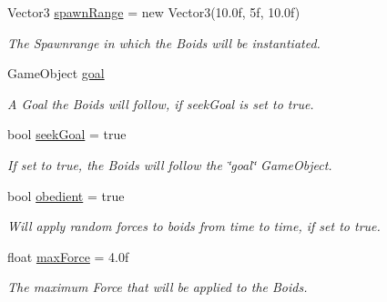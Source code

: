 \begin{DoxyCompactItemize}
Vector3 \hyperlink{class_p_s_flocking_1_1_p_s_unit_manager_aa9c3797d524485b906ca919640f80c57}{spawn\+Range} = new Vector3(10.\+0f, 5f, 10.\+0f)
\begin{DoxyCompactList}\small\item\em The Spawnrange in which the Boids will be instantiated. \end{DoxyCompactList}\item 
\mbox{\label{class_p_s_flocking_1_1_p_s_unit_manager_acab1025d71a518ffd6fdecfbeef80b0a}} 
Game\+Object \hyperlink{class_p_s_flocking_1_1_p_s_unit_manager_acab1025d71a518ffd6fdecfbeef80b0a}{goal}
\begin{DoxyCompactList}\small\item\em A Goal the Boids will follow, if seek\+Goal is set to true. \end{DoxyCompactList}\item 
\mbox{\label{class_p_s_flocking_1_1_p_s_unit_manager_ae308dcd912212ae803fd6d9c48b25288}} 
bool \hyperlink{class_p_s_flocking_1_1_p_s_unit_manager_ae308dcd912212ae803fd6d9c48b25288}{seek\+Goal} = true
\begin{DoxyCompactList}\small\item\em If set to true, the Boids will follow the \char`\"{}goal\char`\"{} Game\+Object. \end{DoxyCompactList}\item 
\mbox{\label{class_p_s_flocking_1_1_p_s_unit_manager_a6ee39d3bff7f5f98b688738c82dbfbf3}} 
bool \hyperlink{class_p_s_flocking_1_1_p_s_unit_manager_a6ee39d3bff7f5f98b688738c82dbfbf3}{obedient} = true
\begin{DoxyCompactList}\small\item\em Will apply random forces to boids from time to time, if set to true. \end{DoxyCompactList}\item 
\mbox{\label{class_p_s_flocking_1_1_p_s_unit_manager_ad4a71076e0bd500485ef978e3a71ea8e}} 
float \hyperlink{class_p_s_flocking_1_1_p_s_unit_manager_ad4a71076e0bd500485ef978e3a71ea8e}{max\+Force} = 4.\+0f
\begin{DoxyCompactList}\small\item\em The maximum Force that will be applied to the Boids. \end{DoxyCompactList}\item 

\end{DoxyCompactItemize}

